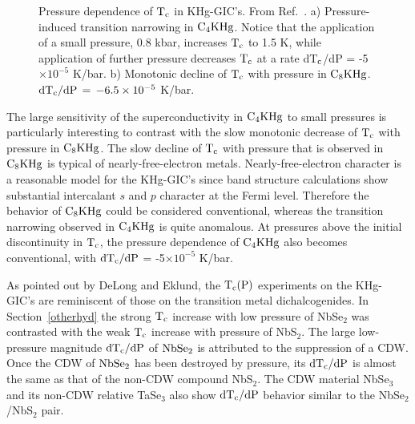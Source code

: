 \begin{figure}
\vspace{20cm}
\caption[Pressure dependence of $\rm T_c$ in KHg-GIC's]{Pressure
dependence  of  $\rm T_c$  in KHg-GIC's.    From  Ref.~\cite{delong83}.  a)
Pressure-induced  transition narrowing  in  $\rm  C_4KHg$.  Notice that the
application  of a small pressure, 0.8  kbar, increases $\rm  T_c$ to 1.5 K,
while application  of  further pressure decreases  $\rm    T_c$  at a  rate
dT$\rm_c$/dP = -5$\times10^{-5}$ K/bar. b)  Monotonic decline of $\rm  T_c$
with   pressure in $\rm C_8KHg$.  $\rm  dT_c/dP \,  = \, -6.5\times10^{-5}$
K/bar.}
\label{stitcvsP}
\end{figure}


        The large sensitivity of the  superconductivity  in $\rm C_4KHg$ to
small  pressures  is  particularly interesting  to  contrast with  the slow
monotonic      decrease of  $\rm       T_c$  with    pressure    in    $\rm
C_8KHg$.\cite{delong82a} The slow  decline of $\rm  T_c$ with pressure that
is  observed     in $\rm   C_8KHg$    is typical    of nearly-free-electron
metals.\cite{delong82a}  Nearly-free-electron   character  is a  reasonable
model        for      the    KHg-GIC's       since          band  structure
calculations\cite{senbetu85,holzwarth88} show   substantial intercalant $s$
and  $p$ character  at the  Fermi  level.  Therefore  the behavior  of $\rm
C_8KHg$ could be considered  conventional, whereas the transition narrowing
observed in  $\rm  C_4KHg$ is quite   anomalous.    At pressures above  the
initial discontinuity in $\rm T_c$, the pressure dependence of $\rm C_4KHg$
also  becomes   conventional,   with $\rm   dT_c/dP$   = -5$\times 10^{-5}$
K/bar.\cite{delong83}

        As pointed  out by  DeLong and Eklund,\cite{delong82a,delong83} the
$\rm T_c(P)$ experiments on the  KHg-GIC's are reminiscent of  those on the
transition metal dichalcogenides.   In  Section~\ref{otherhyd}  the  strong
$\rm  T_c$ increase with low  pressure of NbSe$_2$ was  contrasted with the
weak  $\rm T_c$ increase  with pressure of NbS$_2$.\cite{smith72} The large
low-pressure magnitude $\rm  dT_c/dP$ of $\rm NbSe_2$  is attributed to the
suppression of a  CDW.  Once the CDW of  $\rm NbSe_2$ has been destroyed by
pressure, its $\rm dT_c/dP$  is  almost the  same  as that  of  the non-CDW
compound NbS$_2$.\cite{smith72}  The CDW material NbSe$_3$ and  its non-CDW
relative TaSe$_3$ also show $\rm   dT_c/dP$   behavior similar  to    the
NbSe$_2$/NbS$_2$ pair.

